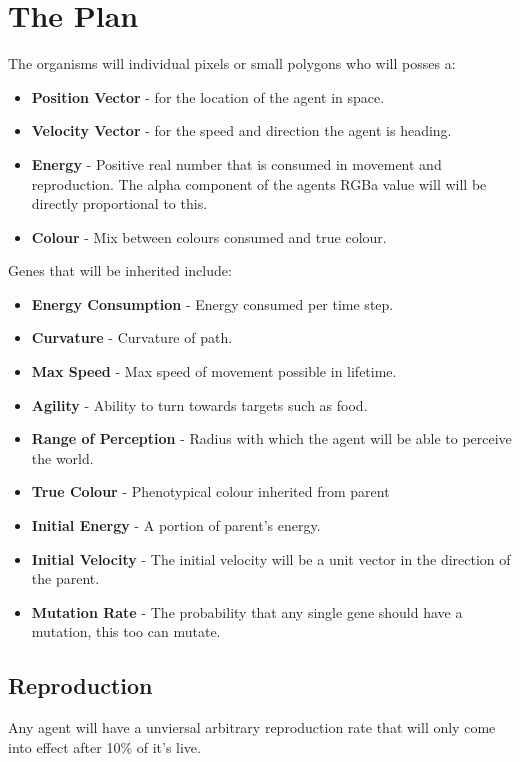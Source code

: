\documentclass{article}
\begin{document}
\section*{The Plan}
The organisms will individual pixels or small polygons who will posses a:
\begin{itemize}
    \item \textbf{Position Vector} - for the location of the agent in space.
    \item \textbf{Velocity Vector} - for the speed and direction the agent is heading.
    \item \textbf{Energy} - Positive real number that is consumed in movement and reproduction. The alpha component of the agents RGBa value will will be directly proportional to this.
    \item \textbf{Colour} - Mix between colours consumed and true colour.
\end{itemize}
Genes that will be inherited include:
\begin{itemize}
    \item \textbf{Energy Consumption} - Energy consumed per time step.
    \item \textbf{Curvature} - Curvature of path.
    \item \textbf{Max Speed} - Max speed of movement possible in lifetime.
    \item \textbf{Agility} - Ability to turn towards targets such as food.
    \item \textbf{Range of Perception} - Radius with which the agent will be able to perceive the world.
    \item \textbf{True Colour} - Phenotypical colour inherited from parent
    \item \textbf{Initial Energy} - A portion of parent's energy.
    \item \textbf{Initial Velocity} - The initial velocity will be a unit vector in the direction of the parent.
    \item \textbf{Mutation Rate} - The probability that any single gene should have a mutation, this too can mutate.
\end{itemize}
\subsection*{Reproduction}
Any agent will have a unviersal arbitrary reproduction rate that will only come into effect after 10\% of it's live.
\end{document}
